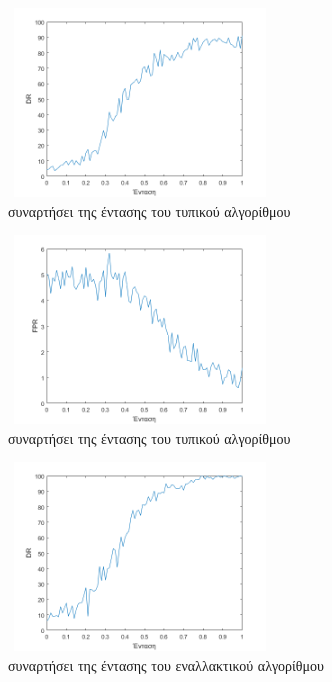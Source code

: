 \begin{figure}
\centering
\begin{subfigure}[b]{0.4\textwidth}
 \includegraphics[width=70mm, height=50mm]{../../plots/gr_dr_intensity_semi_sup1.png}
\caption{ συναρτήσει της έντασης του τυπικού αλγορίθμου}
\label{fig:testintdrsemisup1}
\end{subfigure}
\quad
\begin{subfigure}[b]{0.4\textwidth}
\includegraphics[width=70mm, height=50mm]{../../plots/gr_fpr_intensity_semi_sup1.png}
\caption{ συναρτήσει της έντασης του τυπικού αλγορίθμου}
\label{fig:testintfprsemisup1}
\end{subfigure}
\quad
\begin{subfigure}[b]{0.4\textwidth}
 \includegraphics[width=70mm, height=50mm]{../../plots/gr_dr_intensity_semi_sup2.png}
\caption{ συναρτήσει της έντασης του εναλλακτικού αλγορίθμου}
\label{fig:testintdrsemisup2}
\end{subfigure}
\quad
\begin{subfigure}[b]{0.4\textwidth}

\end{subfigure}
\end{figure}
